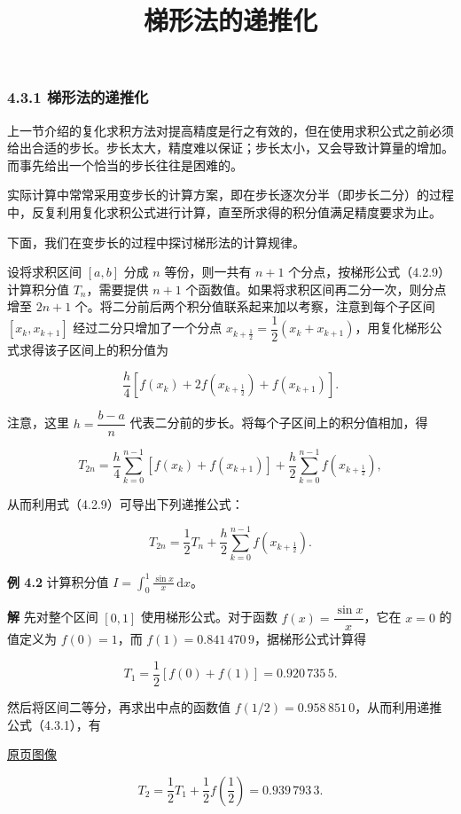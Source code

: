 \documentclass[
  10pt,
  fontset=fandol]{ctexart}
\title{梯形法的递推化}
\author{}
\date{}
\begin{document}
\maketitle

\subsubsection{4.3.1 梯形法的递推化}\label{ux68afux5f62ux6cd5ux7684ux9012ux63a8ux5316}

上一节介绍的复化求积方法对提高精度是行之有效的，但在使用求积公式之前必须给出合适的步长。步长太大，精度难以保证；步长太小，又会导致计算量的增加。而事先给出一个恰当的步长往往是困难的。

实际计算中常常采用变步长的计算方案，即在步长逐次分半（即步长二分）的过程中，反复利用复化求积公式进行计算，直至所求得的积分值满足精度要求为止。

下面，我们在变步长的过程中探讨梯形法的计算规律。

设将求积区间 \([a,b]\) 分成 \(n\) 等份，则一共有 \(n+1\) 个分点，按梯形公式（4.2.9）计算积分值 \(T_n\)，需要提供 \(n+1\) 个函数值。如果将求积区间再二分一次，则分点增至 \(2n+1\) 个。将二分前后两个积分值联系起来加以考察，注意到每个子区间 \([x_k,x_{k+1}]\) 经过二分只增加了一个分点 \(x_{k+\frac12}=\dfrac12(x_k+x_{k+1})\)，用复化梯形公式求得该子区间上的积分值为

\[
\frac h4[f(x_k)+2f(x_{k+\frac12})+f(x_{k+1})].
\]

注意，这里 \(h=\dfrac{b-a}{n}\) 代表二分前的步长。将每个子区间上的积分值相加，得

\[
T_{2n}=\frac h4\sum_{k=0}^{n-1}[f(x_k)+f(x_{k+1})]+\frac h2\sum_{k=0}^{n-1}f(x_{k+\frac12}),
\]

从而利用式（4.2.9）可导出下列递推公式：

\[
T_{2n}=\frac12T_n+\frac h2\sum_{k=0}^{n-1}f(x_{k+\frac12}).
\tag{4.3.1}
\]

\textbf{例 4.2} 计算积分值 \(I=\displaystyle\int_0^1\frac{\sin x}{x}\,\mathrm{d}x\)。

\textbf{解} 先对整个区间 \([0,1]\) 使用梯形公式。对于函数 \(f(x)=\dfrac{\sin x}{x}\)，它在 \(x=0\) 的值定义为 \(f(0)=1\)，而 \(f(1)=0.841\,470\,9\)，据梯形公式计算得

\[
T_1=\frac12[f(0)+f(1)]=0.920\,735\,5.
\]

然后将区间二等分，再求出中点的函数值 \(f(1/2)=0.958\,851\,0\)，从而利用递推公式（4.3.1），有

\href{../../source-images/pdf-102.jpeg}{原页图像}

\[
T_2=\frac12T_1+\frac12f\left(\frac12\right)=0.939\,793\,3.
\]
\end{document}
